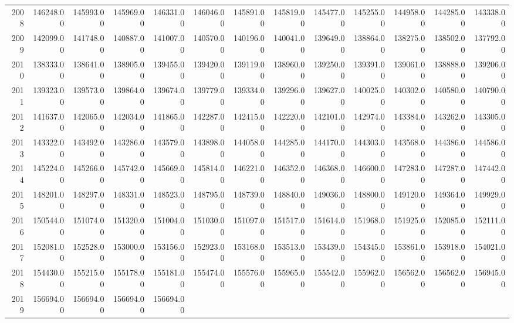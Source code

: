 \begin{longtable}{rrrrrrrrrrrrr}
  2008 & 146248.00 & 145993.00 & 145969.00 & 146331.00 & 146046.00 & 145891.00 & 145819.00 & 145477.00 & 145255.00 & 144958.00 & 144285.00 & 143338.00 \\ 
  2009 & 142099.00 & 141748.00 & 140887.00 & 141007.00 & 140570.00 & 140196.00 & 140041.00 & 139649.00 & 138864.00 & 138275.00 & 138502.00 & 137792.00 \\ 
  2010 & 138333.00 & 138641.00 & 138905.00 & 139455.00 & 139420.00 & 139119.00 & 138960.00 & 139250.00 & 139391.00 & 139061.00 & 138888.00 & 139206.00 \\ 
  2011 & 139323.00 & 139573.00 & 139864.00 & 139674.00 & 139779.00 & 139334.00 & 139296.00 & 139627.00 & 140025.00 & 140302.00 & 140580.00 & 140790.00 \\ 
  2012 & 141637.00 & 142065.00 & 142034.00 & 141865.00 & 142287.00 & 142415.00 & 142220.00 & 142101.00 & 142974.00 & 143384.00 & 143262.00 & 143305.00 \\ 
  2013 & 143322.00 & 143492.00 & 143286.00 & 143579.00 & 143898.00 & 144058.00 & 144285.00 & 144170.00 & 144303.00 & 143568.00 & 144386.00 & 144586.00 \\ 
  2014 & 145224.00 & 145266.00 & 145742.00 & 145669.00 & 145814.00 & 146221.00 & 146352.00 & 146368.00 & 146600.00 & 147283.00 & 147287.00 & 147442.00 \\ 
  2015 & 148201.00 & 148297.00 & 148331.00 & 148523.00 & 148795.00 & 148739.00 & 148840.00 & 149036.00 & 148800.00 & 149120.00 & 149364.00 & 149929.00 \\ 
  2016 & 150544.00 & 151074.00 & 151320.00 & 151004.00 & 151030.00 & 151097.00 & 151517.00 & 151614.00 & 151968.00 & 151925.00 & 152085.00 & 152111.00 \\ 
  2017 & 152081.00 & 152528.00 & 153000.00 & 153156.00 & 152923.00 & 153168.00 & 153513.00 & 153439.00 & 154345.00 & 153861.00 & 153918.00 & 154021.00 \\ 
  2018 & 154430.00 & 155215.00 & 155178.00 & 155181.00 & 155474.00 & 155576.00 & 155965.00 & 155542.00 & 155962.00 & 156562.00 & 156562.00 & 156945.00 \\ 
  2019 & 156694.00 & 156694.00 & 156694.00 & 156694.00 &  &  &  &  &  &  &  &  \\ 
   \hline
\hline
\end{longtable}
